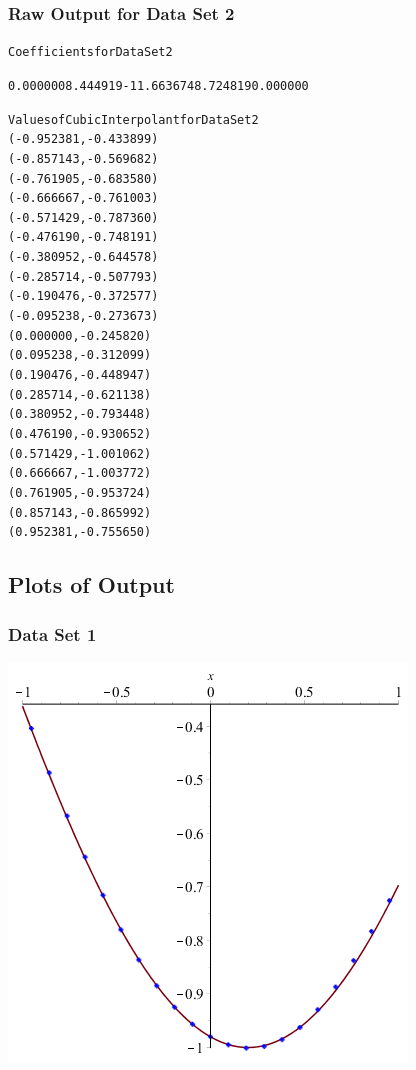 \documentclass[11pt]{article} %
\begin{document}
\subsubsection*{Raw Output for Data Set 2}
\begin{alltt}
Coefficients for Data Set 2

0.000000	8.444919	-11.663674	8.724819	0.000000	

 Values of Cubic Interpolant for Data Set 2
(-0.952381, -0.433899)
(-0.857143, -0.569682)
(-0.761905, -0.683580)
(-0.666667, -0.761003)
(-0.571429, -0.787360)
(-0.476190, -0.748191)
(-0.380952, -0.644578)
(-0.285714, -0.507793)
(-0.190476, -0.372577)
(-0.095238, -0.273673)
(0.000000, -0.245820)
(0.095238, -0.312099)
(0.190476, -0.448947)
(0.285714, -0.621138)
(0.380952, -0.793448)
(0.476190, -0.930652)
(0.571429, -1.001062)
(0.666667, -1.003772)
(0.761905, -0.953724)
(0.857143, -0.865992)
(0.952381, -0.755650)
\end{alltt}
\subsection*{Plots of Output}
\subsubsection*{Data Set 1}
\includegraphics[scale=.5]{plots/dataset1approx.png}
\end{document}

